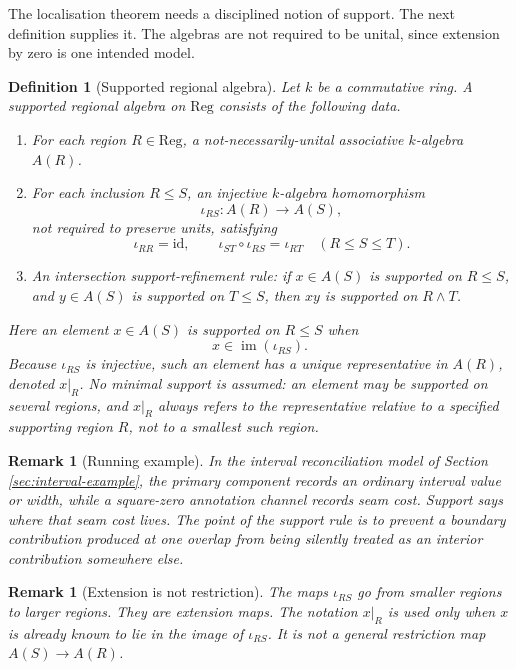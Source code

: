 \documentclass[11pt]{article}
\newtheorem{definition}[theorem]{Definition}
\newtheorem{remark}[theorem]{Remark}
\newcommand{\Reg}{\mathrm{Reg}}
\newcommand{\im}{\operatorname{im}}
\begin{document}
The localisation theorem needs a disciplined notion of support. The next definition supplies it. The algebras are not required to be unital, since extension by zero is one intended model.

\begin{definition}[Supported regional algebra]
Let \(k\) be a commutative ring. A supported regional algebra on \(\Reg\) consists of the following data.

\begin{enumerate}[label=(\roman*)]
\item For each region \(R\in \Reg\), a not-necessarily-unital associative \(k\)-algebra \(A(R)\).

\item For each inclusion \(R\leq S\), an injective \(k\)-algebra homomorphism
\[
\iota_{RS}:A(R)\to A(S),
\]
not required to preserve units, satisfying
\[
\iota_{RR}=\mathrm{id},
\qquad
\iota_{ST}\circ \iota_{RS}=\iota_{RT}
\quad (R\leq S\leq T).
\]

\item An intersection support-refinement rule: if \(x\in A(S)\) is supported on \(R\leq S\), and \(y\in A(S)\) is supported on \(T\leq S\), then \(xy\) is supported on \(R\wedge T\).
\end{enumerate}

Here an element \(x\in A(S)\) is supported on \(R\leq S\) when
\[
x\in \im(\iota_{RS}).
\]
Because \(\iota_{RS}\) is injective, such an element has a unique representative in \(A(R)\), denoted \(x\rvert_R\). No minimal support is assumed: an element may be supported on several regions, and \(x\rvert_R\) always refers to the representative relative to a specified supporting region \(R\), not to a smallest such region.
\end{definition}

\begin{remark}[Running example]
In the interval reconciliation model of Section \ref{sec:interval-example}, the primary component records an ordinary interval value or width, while a square-zero annotation channel records seam cost. Support says where that seam cost lives. The point of the support rule is to prevent a boundary contribution produced at one overlap from being silently treated as an interior contribution somewhere else.
\end{remark}

\begin{remark}[Extension is not restriction]
The maps \(\iota_{RS}\) go from smaller regions to larger regions. They are extension maps. The notation \(x\rvert_R\) is used only when \(x\) is already known to lie in the image of \(\iota_{RS}\). It is not a general restriction map \(A(S)\to A(R)\).
\end{remark}
\end{document}

